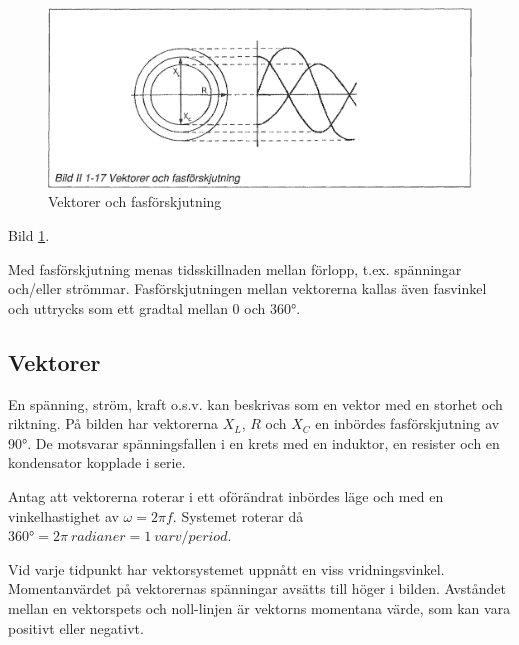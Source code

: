 \begin{figure}[h]
\includegraphics[width=\textwidth]{images/bild_2_1-17}
\caption{Vektorer och fasförskjutning}
\label{fig:BildII1-17}
\end{figure}

Bild \ref{fig:BildII1-17}.

Med fasförskjutning menas tidsskillnaden mellan förlopp, t.ex. spänningar
och/eller strömmar. Fasförskjutningen mellan vektorerna kallas även fasvinkel
och uttrycks som ett gradtal mellan 0 och 360°.

\subsection{Vektorer}

En spänning, ström, kraft o.s.v. kan beskrivas som en vektor med en storhet och
riktning. På bilden har vektorerna \(X_L\), \(R\) och \(X_C\) en inbördes
fasförskjutning av 90°. De motsvarar spänningsfallen i en krets med en
induktor, en resister och en kondensator kopplade i serie.

Antag att vektorerna roterar i ett oförändrat inbördes läge och med en
vinkelhastighet av \(\omega= 2\pi f\). Systemet roterar då
\(360° = 2\pi\ radianer = 1\ varv/period\).

Vid varje tidpunkt har vektorsystemet uppnått en viss vridningsvinkel.
Momentanvärdet på vektorernas spänningar avsätts till höger i bilden. Avståndet
mellan en vektorspets och noll-linjen är vektorns momentana värde, som kan vara
positivt eller negativt.
